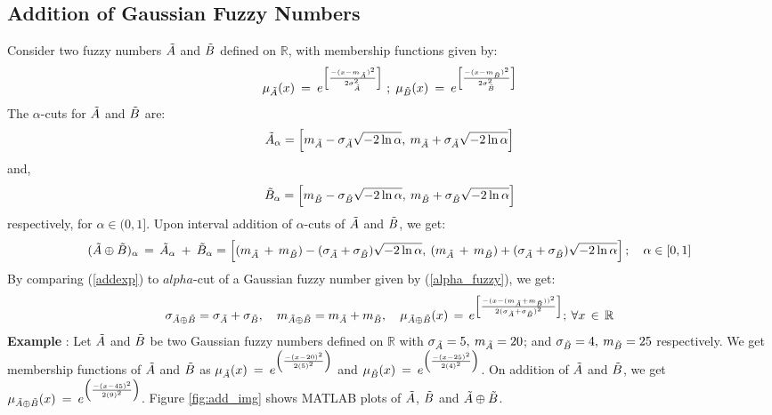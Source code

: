 \documentclass{article}
\begin{document}
\subsection{Addition of Gaussian Fuzzy Numbers}
Consider two fuzzy numbers $\Tilde{A}$ and $\Tilde{B}$ defined on $\mathbb{R}$, with membership functions given by:
\[ \mu_{\Tilde{A}}(x) \:=\:e^{\left[ \frac{-(x-m_{\Tilde{A}})^2}{2\sigma_{\Tilde{A}}^{2}} \right]}\;  ; \;\mu_{\Tilde{B}}(x) \: = \:e^{\left[ \frac{-(x-m_{\Tilde{B}})^2}{2\sigma_{\Tilde{B}}^{2}} \right]} \]
The $\alpha$-cuts for $\Tilde{A}$ and $\Tilde{B}$ are: \[ \Tilde{A}_{\alpha} = \left[m_{\Tilde{A}}-\sigma_{\Tilde{A}}\sqrt{-2\ln{\alpha}}, \: m_{\Tilde{A}}+\sigma_{\Tilde{A}}\sqrt{-2\ln{\alpha}} \right]\] and, \[ \Tilde{B}_{\alpha} = \left[m_{\Tilde{B}}-\sigma_{\Tilde{B}}\sqrt{-2\ln{\alpha}}, \: m_{\Tilde{B}}+\sigma_{\Tilde{B}}\sqrt{-2\ln{\alpha}} \right]\] respectively, for $\alpha\in(0,1]$. Upon interval addition of $\alpha$-cuts of $\Tilde{A}$ and $\Tilde{B}$, we get:
\begin{equation}\label{addexp}
 (\Tilde{A}\oplus\Tilde{B})_\alpha\,=\, \Tilde{A}_\alpha \: + \: \Tilde{B}_\alpha = \left[(m_{\Tilde{A}}\, + \, m_{\Tilde{B}})-(\sigma_{\Tilde{A}}+\sigma_{\Tilde{B}})\sqrt{-2\ln{\alpha}}, \: (m_{\Tilde{A}}\, + \, m_{\Tilde{B}})+(\sigma_{\Tilde{A}}+\sigma_{\Tilde{B}})\sqrt{-2\ln{\alpha}}\right] ; \quad\alpha\in [0,1]  
\end{equation} \newline By comparing (\ref{addexp}) to $alpha$-cut of a Gaussian fuzzy number given by (\ref{alpha_fuzzy}), we get:
\begin{equation}
    \sigma_{\Tilde{A}\oplus\Tilde{B}} = \sigma_{\Tilde{A}} + \sigma_{\Tilde{B}}, \quad m_{\Tilde{A}\oplus\Tilde{B}} = m_{\Tilde{A}} + m_{\Tilde{B}}, \quad 
    \mu_{\Tilde{A}\oplus\Tilde{B}}(x) \,=\, e^{\left[ \frac{-(x-(m_{\Tilde{A}} + m_{\Tilde{B}} ))^2}{2(\sigma_{\Tilde{A}} + \sigma_{\Tilde{B}} )^{2}} \right]};\: \forall x \,\in\, \mathbb{R}
\end{equation}
\newline
\textbf{Example} : Let $\Tilde{A}$ and $\Tilde{B}$ be two Gaussian fuzzy numbers defined on $\mathbb{R}$ with $\sigma_{\Tilde{A}} = 5, \:m_{\Tilde{A}} = 20$; and $\sigma_{\Tilde{B}} = 4, \:m_{\Tilde{B}} = 25$ respectively. We get membership functions of $\Tilde{A}$ and $\Tilde{B}$ as $\mu_{\Tilde{A}}(x) \:=\:e^{\left( \frac{-(x-20)^2}{2(5)^{2}} \right)}$ and $\mu_{\Tilde{B}}(x) \:=\:e^{\left( \frac{-(x-25)^2}{2(4)^{2}} \right)}$. On addition of $\Tilde{A}$ and $\Tilde{B}$, we get $\mu_{\Tilde{A}\oplus\Tilde{B}}(x) \:=\:e^{\left( \frac{-(x-45)^2}{2(9)^{2}}\right)}$. Figure \ref{fig:add_img} shows MATLAB plots of $\Tilde{A}$, $\Tilde{B}$ and $\Tilde{A}\oplus\Tilde{B}$.
\end{document}
